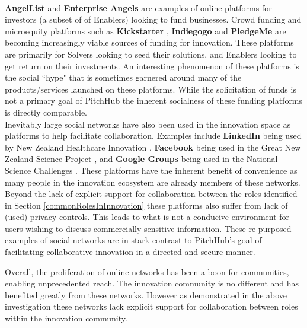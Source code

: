 \\
\newline
\textbf{AngelList} \cite{Angel:online} and \textbf{Enterprise Angels} \cite{enterpriseAngles:online} are examples of online platforms for investors (a subset of of Enablers) looking to fund businesses. Crowd funding and microequity platforms such as \textbf{Kickstarter} \cite{Kicks6:online}, \textbf{Indiegogo} \cite{Indie3:online} and \textbf{PledgeMe} \cite{Pledge:online} are becoming increasingly viable sources of funding for innovation. These platforms are primarily for Solvers looking to seed their solutions, and Enablers looking to get return on their investments. An interesting phenomenon of these platforms is the social ``hype" that is sometimes garnered around many of the products/services launched on these platforms. While the solicitation of funds is not a primary goal of PitchHub the inherent socialness of these funding platforms is directly comparable.
\\
\newline
Inevitably large social networks have also been used in the innovation space as platforms to help facilitate collaboration. Examples include \textbf{LinkedIn} \cite{Linkedin:online} being used by New Zealand Healthcare Innovation \cite{nzHealthCare:online}, \textbf{Facebook} \cite{Faceb6:online} being used in the Great New Zealand Science Project \cite{greatNZScience:online}, and \textbf{Google Groups} \cite{Googlegroups:online} being used in the National Science Challenges \cite{nzNSC10:online}. These platforms have the inherent benefit of convenience as many people in the innovation ecosystem are already members of these networks. Beyond the lack of explicit support for collaboration between the roles identified in Section \ref{commonRolesInInnovation} these platforms also suffer from lack of (used) privacy controls. This leads to what is not a conducive environment for users wishing to discuss commercially sensitive information. These re-purposed examples of social networks are in stark contrast to PitchHub's goal of facilitating collaborative innovation in a directed and secure manner.

Overall, the proliferation of online networks has been a boon for communities, enabling unprecedented reach. The innovation community is no different and has benefited greatly from these networks. However as demonstrated in the above investigation these networks lack explicit support for collaboration between roles within the innovation community.

